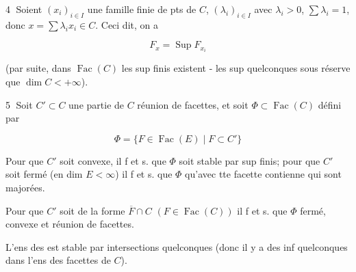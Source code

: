 
\textcircled{4} Soient $(x_i)_{i\in I}$ une famille finie de pts de $C$, $(\lambda_i)_{i\in I}$ avec $\lambda_i>0$, $\sum\lambda_i=1$, donc $x=\sum\lambda_i x_i\in C$. Ceci dit, on a

\[
 F_x=\operatorname{Sup} F_{x_i}
\]

(par suite, dans $\operatorname{Fac}(C)$ les sup finis existent -  les sup quelconques sous réserve que $\dim C<+\infty$).

\textcircled{5} Soit $C'\subset C$ une partie de $C$ réunion de facettes, et soit $\Phi\subset\operatorname{Fac}(C)$ défini par

\[
 \Phi=\{F\in\operatorname{Fac}(E)\mid F\subset C'\}
\]

Pour que $C'$ soit convexe, il f et s. que $\Phi$ soit stable par sup finis; pour que $C'$ soit   fermé  (en dim $E<\infty$) il f et s. que $\Phi$  qu'avec tte facette  contienne  qui sont majorées.

 Pour que $C'$ soit de la forme $\overline F\cap C$ $(F\in\operatorname{Fac}(C))$ il f et s. que $\Phi$  fermé, convexe et   réunion de facettes.

L'ens des   est stable par intersections quelconques (donc il y a des inf quelconques dans l'ens des facettes de $C$).
